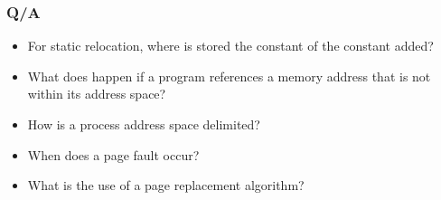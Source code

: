   \begin{frame}
    \frametitle{Q/A}
    \begin{itemize}
      \item For static relocation, where is stored the constant of the constant added? %
      \item What does happen if a program references a memory address that is not within its address space? %
      \item How is a process address space delimited? %
      \item When does a page fault occur? %
      \item What is the use of a page replacement algorithm? %
    \end{itemize}
  \end{frame}

